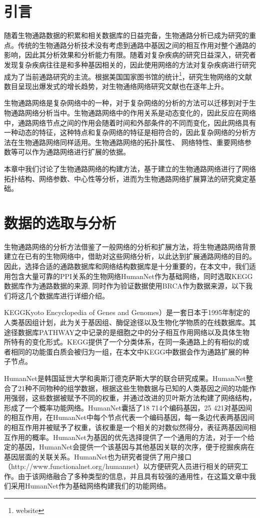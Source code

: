\section{引言}
随着生物通路数据的积累和相关数据库的日益完备，生物通路分析已成为研究的重点。传统的生物通路分析技术没有考虑到通路中基因之间的相互作用对整个通路的影响，因此其分析效果和分析能力有限。随着对复杂疾病的研究日益深入，研究者发现复杂疾病往往是和多种基因相关的，因此使用网络的方法对复杂疾病进行研究成为了当前通路研究的主流。根据美国国家图书馆的统计\footnote{website}，研究生物网络的文献数目呈现出爆发式的增长趋势，对生物通络网络研究文献也在逐年上升。

生物通路网络是复杂网络中的一种，对于复杂网络的分析的方法可以迁移到对于生物通路网络分析当中。生物通路网络中的作用关系是动态变化的，因此反应在网络中，通路网络节点之间的作用会随着时间和外部条件的不同而变化，因此网络具有一种动态的特征，这种特点和复杂网络的特征是相符合的，因此复杂网络的分析方法在生物通路网络同样适用。生物通路网络的拓扑属性、 网络特性、重要网络参数等可以作为通路网络进行扩展的依据。

本章中我们讨论了生物通路网络的构建方法，基于建立的生物通路网络进行了网络拓扑结构、网络参数、中心性等分析，进而为生物通路网络扩展算法的研究奠定基础。

\section{数据的选取与分析}
生物通路网络的分析方法借鉴了一般网络的分析和扩展方法，将生物通路网络背景建立在已有的生物网络中，借助对这些网络分析，以此达到扩展通路网络的目的。因此，选择合适的通路数据库和网络结构数据库是十分重要的，在本文中，我们适用包含大量可靠的PPI关系的生物网络HumanNet\cite{}作为基础网络，同时选取KEGG\cite{}数据库作为通路数据的来源, 同时作为验证数据使用BRCA作为数据来源，以下我们将这几个数据库进行详细介绍。

KEGG\cite{}Kyoto Encyclopedia of Genes and Genomes）是一套日本于1995年制定的人类基因组计划，此为关于基因组、酶促途径以及生物化学物质的在线数据库。其途径数据库PATHWAY之中记录的是细胞之中的分子相互作用网络以及具体生物所特有的变化形式。KEGG\cite{}提供了一个分类体系，在同一条通路上的有相似的或者相同的功能蛋白质会被归为一组，在本文中KEGG中数据会作为通路扩展的种子节点。

HumanNet\cite{}是韩国延世大学和奥斯汀德克萨斯大学的联合研究成果。HumanNet\cite{}整合了21种不同物种的组学数据，根据这些生物数据与已知的人类基因之间的功能作用强弱，这些数据被赋予不同的权重，并通过改进的贝叶斯方法构建了网络结构，形成了一个概率功能网络。HumanNet\cite{}囊括了18 714个编码基因，25 421对基因间的相互作用，在HumanNet\cite{}中每个节点代表一个编码基因，每一条边代表两基因间的相互作用并被赋予了权重，该权重是一个相关的对数似然得分，表征两基因间相互作用的概率。HumanNet\cite{}为基因的优先选择提供了一个通用的方法，对于一个给定的基因，HumanNet\cite{}会提供一个该基因与其他基因关联的次序，便于挖掘疾病在基因层面的关联关系。HumanNet\cite{}也为研究者提供了用户接口（http://www.functionalnet.org/humannet）以方便研究人员进行相关的研究工作。由于该网络融合了多种类型的信息，并且具有较强的通用性，在这篇文章中我们采用HumanNet\cite{}作为基础网络构建我们的功能网络。

